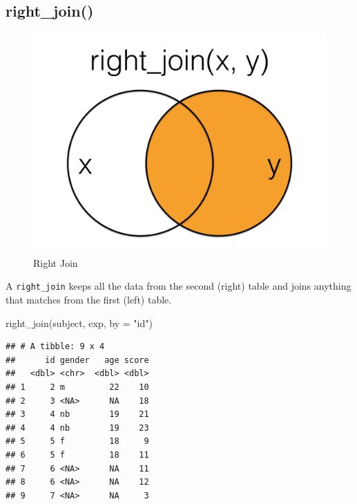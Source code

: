 \documentclass[
  oneside]{book}
\newenvironment{Shaded}{\begin{snugshade}}{\end{snugshade}}
\newcommand{\AttributeTok}[1]{\textcolor[rgb]{0.77,0.63,0.00}{#1}}
\newcommand{\FunctionTok}[1]{\textcolor[rgb]{0.00,0.00,0.00}{#1}}
\newcommand{\NormalTok}[1]{#1}
\newcommand{\StringTok}[1]{\textcolor[rgb]{0.31,0.60,0.02}{#1}}
\begin{document}
\hypertarget{right_join}{%
\subsection{right\_join()}\label{right_join}}

\begin{figure}

{\centering \includegraphics[width=1\linewidth]{images/joins/right_join} 

}

\caption{Right Join}\label{fig:img-right-join}
\end{figure}

A \texttt{right\_join} keeps all the data from the second (right) table and joins anything that matches from the first (left) table.

\begin{Shaded}
\begin{Highlighting}[]
\FunctionTok{right\_join}\NormalTok{(subject, exp, }\AttributeTok{by =} \StringTok{"id"}\NormalTok{)}
\end{Highlighting}
\end{Shaded}

\begin{verbatim}
## # A tibble: 9 x 4
##      id gender   age score
##   <dbl> <chr>  <dbl> <dbl>
## 1     2 m         22    10
## 2     3 <NA>      NA    18
## 3     4 nb        19    21
## 4     4 nb        19    23
## 5     5 f         18     9
## 6     5 f         18    11
## 7     6 <NA>      NA    11
## 8     6 <NA>      NA    12
## 9     7 <NA>      NA     3
\end{verbatim}
\end{document}
